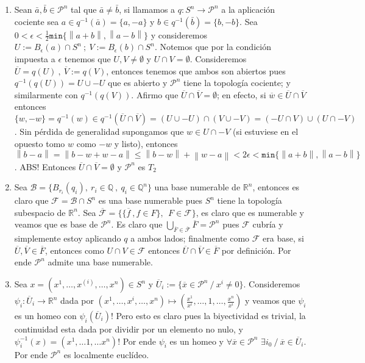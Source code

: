 \documentclass[11pt]{article}
\newcommand{\B}{\mathcal{B}}
\newcommand{\F}{\mathcal{F}}
\newcommand{\Q}{\mathbb{Q}}
\renewcommand{\P}{\mathcal{P}}
\newcommand{\R}{{\mathbb{R}}}
\newcommand\norm[1]{\left\lVert#1\right\rVert}
\newcommand{\sett}[1]{\{#1\}}
\newenvironment{proof}[1][Demostraci\'on]{\begin{trivlist}
\item[\hskip \labelsep {\bfseries #1}]}{\end{trivlist}}
\begin{document}
\begin{proof}
\begin{itemize}
\begin{enumerate}
\item Sean $\bar{a}, \bar{b} \in \P^n$ tal que $\bar{a} \neq \bar{b}$, si llamamos a $q: S^n \rightarrow \P^n$ a la aplicaci\'on cociente sea $a \in q^{-1}(\bar{a}) = \sett{a,-a}$ y $b \in q^{-1}(\bar{b}) = \sett{b,-b}$. Sea $0 < \epsilon < \frac{1}{2}\texttt{min}\sett{\norm{a+b},\norm{a-b}}$ y consideremos $U := B_{\epsilon}(a) \cap S^n \ ; \ V:= B_{\epsilon}(b) \cap S^n$. Notemos que por la condici\'on impuesta a $\epsilon$ tenemos que $U,V \neq \emptyset$ y $U \cap V = \emptyset$. Consideremos $\overline{U} = q(U) \ , \ \overline{V}:=q(V)$, entonces tenemos que ambos son abiertos pues $q^{-1}(q(U)) = U \cup -U$ que es abierto y $\P^n$ tiene la topolog\'ia cociente; y similarmente con $q^{-1}(q(V))$. Afirmo que $\overline{U}\cap \overline{V} = \emptyset$; en efecto, si $\overline{w} \in \overline{U}\cap \overline{V}$ entonces $\sett{w,-w} = q^{-1}(w)\in q^{-1}(\overline{U}\cap \overline{V})= (U \cup -U) \cap (V \cup -V) = (-U \cap V) \cup (U \cap -V)$. Sin p\'erdida de generalidad supongamos que $w \in U \cap -V$ (si estuviese en el opuesto tomo $w$ como $-w$ y listo), entonces $\norm{b-a} = \norm{b-w+w-a} \leq \norm {b-w} + \norm{w-a} < 2\epsilon < \texttt{min}\sett{\norm{a+b},\norm{a-b}}$. ABS! Entonces $\overline{U}\cap \overline{V} = \emptyset$ y $\P^n$ es $T_2$

\item Sea $\B = \sett{B_{r_i}(q_i), \ r_i \in \Q \ , \ q_i \in \Q^n}$ una base numerable de $\R^n$, entonces es claro que $\F = \B \cap S^n$ es una base numerable pues $S^n$ tiene la topolog\'ia subespacio de $\R^n$. Sea $\overline{\F} = \sett{\sett{\overline{f} \ , f \in F} , \ \ F \in \F}$, es claro que es numerable y veamos que es base de $\P^n$. Es claro que $\bigcup_{\overline{F} \in \overline{\F}} {\overline{F}} = \P^n$ pues $\F$ cubr\'ia y simplemente estoy aplicando $q$ a ambos lados; finalmente como $\F$ era base, si $\overline{U},\overline{V} \in \overline{F}$, entonces como $U \cap V \in \F$ entonces $\overline{U}\cap \overline{V} \in \overline{F}$ por definici\'on. Por ende $\P^n$ admite una base numerable.

\item Sea $x= (x^1, \dots{} , x^{(i)} , \dots{} , x^n) \in S^n$ y $\overline{U}_i := \sett{\overline{x} \in \P^n \ / \ x^{i}\neq 0}$. Consideremos $\psi_i : \overline{U}_i \rightarrow \R^{n}$ dada por $(x^1, \dots , x^i , \dots , x^n) \mapsto (\frac{x^1}{x^{i}} , \dots , 1 , \dots , \frac{x^n}{x^{i}})$ y veamos que $\psi_i$ es un homeo con $\psi_i(\overline{U}_i)$! Pero esto es claro pues la biyectividad es trivial, la continuidad esta dada por dividir por un elemento no nulo, y $\psi_{i}^{-1}(x)=(x^1 , \dots 1 , \dots x^n)$! Por ende $\psi_i$ es un homeo y $\forall \overline{x} \in \P^n$ $\exists i_0 \ / \ \overline{x}\in \overline{U}_i$. Por ende $\P^n$ es localmente eucl\'ideo.


\end{enumerate}
\end{itemize}
\end{proof}
\end{document}
